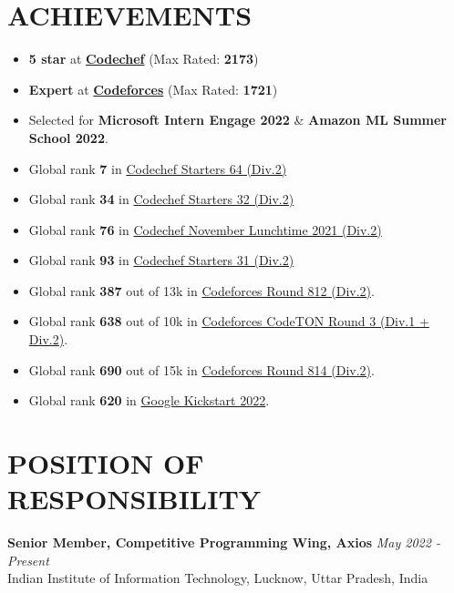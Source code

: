 \documentclass[12pt]{article}
\begin{document}
\section*{ACHIEVEMENTS}
\begin{itemize}[leftmargin=*, topsep=0pt, itemsep=1pt, partopsep=2pt, parsep=2pt]
	\item \textbf{5 star} at \href{https://www.codechef.com/users/prabhav7}{\textbf{Codechef}} (Max Rated: \textbf{2173})
		\item \textbf{Expert} at \href{https://codeforces.com/profile/prabhavagrawal7}{\textbf{Codeforces}} (Max Rated: \textbf{1721})
	\item Selected for \textbf{Microsoft Intern Engage 2022} \& \textbf{Amazon ML Summer School 2022}.
	\item Global rank \textbf{7} in \href{https://www.codechef.com/rankings/START64B?search=prabhav7}{Codechef Starters 64 (Div.2)} 
	\item Global rank \textbf{34} in \href{https://www.codechef.com/rankings/START32B?search=prabhav7}{Codechef Starters 32 (Div.2)} 
	\item Global rank \textbf{76} in \href{https://www.codechef.com/rankings/LTIME102B?search=prabhav7}{Codechef November Lunchtime 2021 (Div.2)} 
	\item Global rank \textbf{93} in \href{https://www.codechef.com/rankings/START31B?search=prabhav7}{Codechef Starters 31 (Div.2)} 
	\item Global rank \textbf{387} out of 13k in \href{https://codeforces.com/contest/1713/standings/participant/137877142#p137877142}{Codeforces Round 812 (Div.2)}.
	\item Global rank \textbf{638} out of 10k in \href{https://codeforces.com/contest/1750/standings/participant/143636092#p143636092}{Codeforces CodeTON Round 3 (Div.1 + Div.2)}.
	\item Global rank \textbf{690} out of 15k in \href{https://codeforces.com/contest/1719/standings/participant/138512906#p138512906}{Codeforces Round 814 (Div.2)}.
	\item Global rank \textbf{620} in \href{https://codingcompetitions.withgoogle.com/kickstart/certificate/summary/00000000008caba4}{Google Kickstart 2022}.
\end{itemize}

\section*{POSITION OF RESPONSIBILITY}
\textbf{Senior Member, Competitive Programming Wing, Axios} \hfill \textit{May 2022 - Present} \\
Indian Institute of Information Technology, Lucknow, Uttar Pradesh, India
\end{document}
